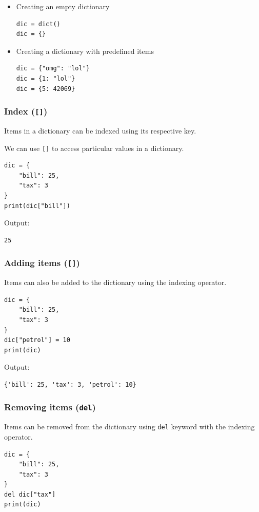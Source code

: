 \documentclass[11pt]{article}
\begin{document}
\begin{itemize}
\item Creating an empty dictionary
\begin{verbatim}
dic = dict()
dic = {}
\end{verbatim}

\item Creating a dictionary with predefined items
\begin{verbatim}
dic = {"omg": "lol"}
dic = {1: "lol"}
dic = {5: 42069}
\end{verbatim}
\end{itemize}

\subsubsection{Index (\texttt{[]})}
\label{sec:org6d0eb60}
Items in a dictionary can be indexed using its respective key.

We can use \texttt{[]} to access particular values in a dictionary.
\begin{verbatim}
dic = {
    "bill": 25,
    "tax": 3
}
print(dic["bill"])
\end{verbatim}

 \noindent Output:

\begin{verbatim}
25
\end{verbatim}

\subsubsection{Adding items (\texttt{[]})}
\label{sec:org0105a6e}
Items can also be added to the dictionary using the indexing operator.
\begin{verbatim}
dic = {
    "bill": 25,
    "tax": 3
}
dic["petrol"] = 10
print(dic)
\end{verbatim}

 \noindent Output:

\begin{verbatim}
{'bill': 25, 'tax': 3, 'petrol': 10}
\end{verbatim}

\subsubsection{Removing items (\texttt{del})}
\label{sec:org63f2d00}
Items can be removed from the dictionary using \texttt{del} keyword with the indexing operator.
\begin{verbatim}
dic = {
    "bill": 25,
    "tax": 3
}
del dic["tax"]
print(dic)
\end{verbatim}
\end{document}
